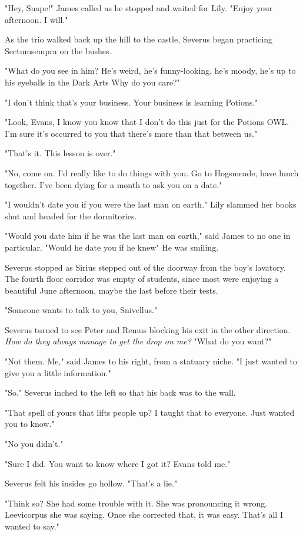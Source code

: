 "Hey, Snape!" James called as he stopped and waited for Lily. "Enjoy your afternoon. I will."

As the trio walked back up the hill to the castle, Severus began practicing Sectumsempra on the bushes.

"What do you see in him? He's weird, he's funny-looking, he's moody, he's up to his eyeballs in the Dark Arts{\el} Why do you care?"

"I don't think that's your business. Your business is learning Potions."

"Look, Evans, I know you know that I don't do this just for the Potions OWL. I'm sure it's occurred to you that there's more than that between us."

"That's it. This lesson is over."

"No, come on. I'd really like to do things with you. Go to Hogsmeade, have lunch together. I've been dying for a month to ask you on a date."

"I wouldn't date you if you were the last man on earth." Lily slammed her books shut and headed for the dormitories.

"Would you date him if he was the last man on earth," said James to no one in particular. "Would he date you if he knew{\el}" He was smiling.

Severus stopped as Sirius stepped out of the doorway from the boy's lavatory. The fourth floor corridor was empty of students, since most were enjoying a beautiful June afternoon, maybe the last before their tests.

"Someone wants to talk to you, Snivellus."

Severus turned to see Peter and Remus blocking his exit in the other direction. \emph{How do they always manage to get the drop on me?} "What do you want?"

"Not them. Me," said James to his right, from a statuary niche. "I just wanted to give you a little information."

"So." Severus inched to the left so that his back was to the wall.

"That spell of yours that lifts people up? I taught that to everyone. Just wanted you to know."

"No you didn't."

"Sure I did. You want to know where I got it? Evans told me."

Severus felt his insides go hollow. "That's a lie."

"Think so? She had some trouble with it. She was pronouncing it wrong. Leevicorpus she was saying. Once she corrected that, it was easy. That's all I wanted to say."

